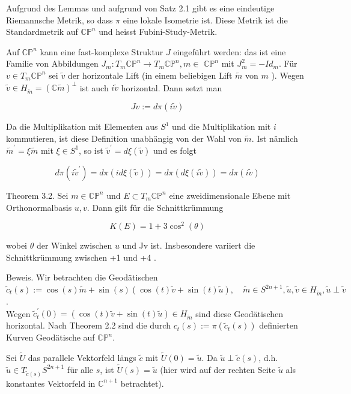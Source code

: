 \documentclass[10pt, letterpaper]{article}
\begin{document}
Aufgrund des Lemmas und aufgrund von Satz 2.1 gibt es eine eindeutige Riemannsche Metrik, so dass $\pi$ eine lokale Isometrie ist. Diese Metrik ist die Standardmetrik auf $\mathbb{C P}^{n}$ und heisst Fubini-Study-Metrik.

Auf $\mathbb{C P}^{n}$ kann eine fast-komplexe Struktur $J$ eingeführt werden: das ist eine Familie von Abbildungen $J_{m}: T_{m} \mathbb{C P}^{n} \rightarrow T_{m} \mathbb{C P}^{n}, m \in$ $\mathbb{C P}^{n}$ mit $J_{m}^{2}=-I d_{m}$. Für $v \in T_{m} \mathbb{C P}^{n}$ sei $\tilde{v}$ der horizontale Lift (in einem beliebigen Lift $\tilde{m}$ von $m$ ). Wegen $\tilde{v} \in H_{\tilde{m}}=(\mathbb{C} \tilde{m})^{\perp}$ ist auch $i \tilde{v}$ horizontal. Dann setzt man

$$
J v:=d \pi(i \tilde{v})
$$

Da die Multiplikation mit Elementen aus $S^{1}$ und die Multiplikation mit $i$ kommutieren, ist diese Definition unabhängig von der Wahl von $\tilde{m}$. Ist nämlich $\tilde{m}^{\prime}=\xi \tilde{m}$ mit $\xi \in S^{1}$, so ist $\tilde{v}^{\prime}=d \xi(\tilde{v})$ und es folgt

$$
d \pi\left(i \tilde{v}^{\prime}\right)=d \pi(i d \xi(\tilde{v}))=d \pi(d \xi(i \tilde{v}))=d \pi(i \tilde{v})
$$

Theorem 3.2. Sei $m \in \mathbb{C P}^{n}$ und $E \subset T_{m} \mathbb{C P}^{n}$ eine zweidimensionale Ebene mit Orthonormalbasis $u, v$. Dann gilt für die Schnittkrümmung

$$
K(E)=1+3 \cos ^{2}(\theta)
$$

wobei $\theta$ der Winkel zwischen $u$ und Jv ist. Insbesondere variiert die Schnittkrümmung zwischen +1 und +4 .

Beweis. Wir betrachten die Geodätischen\\
$\tilde{c}_{t}(s):=\cos (s) \tilde{m}+\sin (s)(\cos (t) \tilde{v}+\sin (t) \tilde{u}), \quad \tilde{m} \in S^{2 n+1}, \tilde{u}, \tilde{v} \in H_{\tilde{m}}, \tilde{u} \perp \tilde{v}$.\\
Wegen $\tilde{c}_{t}^{\prime}(0)=(\cos (t) \tilde{v}+\sin (t) \tilde{u}) \in H_{\tilde{m}}$ sind diese Geodätischen horizontal. Nach Theorem 2.2 sind die durch $c_{t}(s):=\pi\left(\tilde{c}_{t}(s)\right)$ definierten Kurven Geodätische auf $\mathbb{C P}^{n}$.

Sei $\tilde{U}$ das parallele Vektorfeld längs $\tilde{c}$ mit $\tilde{U}(0)=\tilde{u}$. Da $\tilde{u} \perp \tilde{c}(s)$, d.h. $\tilde{u} \in T_{\tilde{c}(s)} S^{2 n+1}$ für alle $s$, ist $\tilde{U}(s)=\tilde{u}$ (hier wird auf der rechten Seite $\tilde{u}$ als konstantes Vektorfeld in $\mathbb{C}^{n+1}$ betrachtet).
\end{document}
